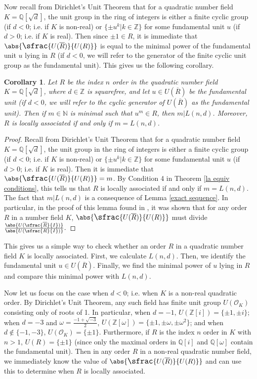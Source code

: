 \documentclass[12pt]{amsart}
\newtheorem{corollary}[theorem]{Corollary}
\theoremstyle{definition}
\newcommand{\bZ}{\mathbb Z}
\newcommand{\bQ}{\mathbb Q}
\newcommand{\bN}{\mathbb N}
\newcommand{\Rbar}{\overline{R}}
\newcommand{\cO}{\mathcal{O}}
\newcommand{\quot}[2]{\large\sfrac{#1}{#2}\normalsize}
\begin{document}
	Now recall from Dirichlet's Unit Theorem that for a quadratic number field $K=\bQ[\sqrt{d}]$, the unit group in the ring of integers is either a finite cyclic group (if $d<0$; i.e. if $K$ is non-real) or $\{\pm u^k|k\in\bZ\}$ for some fundamental unit $u$ (if $d>0$; i.e. if $K$ is real). Then since $\pm 1\in R$, it is immediate that $\abs{\quot{U(\Rbar)}{U(R)}}$ is equal to the minimal power of the fundamental unit $u$ lying in $R$ (if $d<0$, we will refer to the generator of the finite cyclic unit group as the fundamental unit). This gives us the following corollary.
	
	\begin{corollary}
		\label{la iff l function}
		Let $R$ be the index $n$ order in the quadratic number field $K=\bQ[\sqrt{d}]$, where $d\in\bZ$ is squarefree, and let $u\in U(\Rbar)$ be the fundamental unit (if $d<0$, we will refer to the cyclic generator of $U(\Rbar)$ as the fundamental unit). Then if $m\in\bN$ is minimal such that $u^m\in R$, then $m|L(n,d)$. Moreover, $R$ is locally associated if and only if $m=L(n,d)$.
	\end{corollary}
	
	\begin{proof}
		Recall from Dirichlet's Unit Theorem that for a quadratic number field $K=\bQ[\sqrt{d}]$, the unit group in the ring of integers is either a finite cyclic group (if $d<0$; i.e. if $K$ is non-real) or $\{\pm u^k|k\in\bZ\}$ for some fundamental unit $u$ (if $d>0$; i.e. if $K$ is real). Then it is immediate that $\abs{\quot{U(\Rbar)}{U(R)}}=m$. By Condition 4 in Theorem \ref{la equiv conditions}, this tells us that $R$ is locally associated if and only if $m=L(n,d)$. The fact that $m|L(n,d)$ is a consequence of Lemma \ref{exact sequence}. In particular, in the proof of this lemma found in \cite{thesis}, it was shown that for any order $R$ in a number field $K$, $\abs{\quot{U(\Rbar)}{U(R)}}$ must divide $\frac{\abs{U(\sfrac{\Rbar}{I})}}{\abs{U(\sfrac{R}{I})}}.$
	\end{proof}
	
	This gives us a simple way to check whether an order $R$ in a quadratic number field $K$ is locally associated. First, we calculate $L(n,d)$. Then, we identify the fundamental unit $u\in U(\Rbar)$. Finally, we find the minimal power of $u$ lying in $R$ and compare this minimal power with $L(n,d)$.
	
	Now let us focus on the case when $d<0$; i.e. when $K$ is a non-real quadratic order. By Dirichlet's Unit Theorem, any such field has finite unit group $U(\cO_K)$ consisting only of roots of 1. In particular, when $d=-1$, $U(\bZ[i])=\{\pm 1,\pm i\}$; when $d=-3$ and $\omega=\frac{-1+\sqrt{-3}}{2}$, $U(\bZ[\omega])=\{\pm 1, \pm \omega, \pm \omega^2\}$; and when $d\notin\{-1,-3\}$, $U(\cO_K)=\{\pm 1\}$. Furthermore, if $R$ is the index $n$ order in $K$ with $n>1$, $U(R)=\{\pm 1\}$ (since only the maximal orders in $\bQ[i]$ and $\bQ[\omega]$ contain the fundamental unit). Then in any order $R$ in a non-real quadratic number field, we immediately know the value of $\abs{\quot{U(\Rbar)}{U(R)}}$ and can use this to determine when $R$ is locally associated.
	
\end{document}

